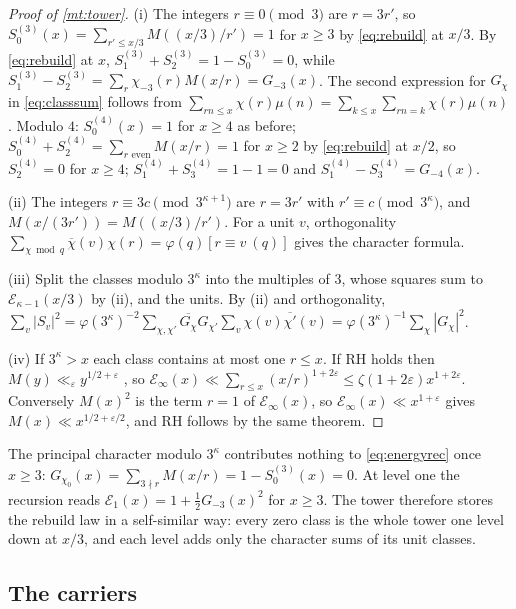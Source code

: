 \documentclass[11pt]{article}
\theoremstyle{definition}\newtheorem{definition}[theorem]{Definition}
\theoremstyle{remark}\newtheorem{remark}[theorem]{Remark}
\theoremstyle{definition}\newtheorem{axiom}{Axiom}
\begin{document}
\begin{proof}[Proof of \cref{mt:tower}]
(i) The integers $r\equiv0\pmod3$ are $r=3r'$, so $S^{(3)}_0(x)=\sum_{r'\le x/3}M((x/3)/r')=1$ for $x\ge3$ by \eqref{eq:rebuild} at $x/3$. By \eqref{eq:rebuild} at $x$, $S^{(3)}_1+S^{(3)}_2=1-S^{(3)}_0=0$, while $S^{(3)}_1-S^{(3)}_2=\sum_r\chi_{-3}(r)M(x/r)=G_{-3}(x)$. The second expression for $G_\chi$ in \eqref{eq:classsum} follows from $\sum_{rn\le x}\chi(r)\mu(n)=\sum_{k\le x}\sum_{rn=k}\chi(r)\mu(n)$. Modulo $4$: $S^{(4)}_0(x)=1$ for $x\ge4$ as before; $S^{(4)}_0+S^{(4)}_2=\sum_{r\text{ even}}M(x/r)=1$ for $x\ge2$ by \eqref{eq:rebuild} at $x/2$, so $S^{(4)}_2=0$ for $x\ge4$; $S^{(4)}_1+S^{(4)}_3=1-1=0$ and $S^{(4)}_1-S^{(4)}_3=G_{-4}(x)$.

(ii) The integers $r\equiv3c\pmod{3^{\kappa+1}}$ are $r=3r'$ with $r'\equiv c\pmod{3^\kappa}$, and $M(x/(3r'))=M((x/3)/r')$. For a unit $v$, orthogonality $\sum_{\chi\bmod q}\overline\chi(v)\chi(r)=\varphi(q)[r\equiv v\ (q)]$ gives the character formula.

(iii) Split the classes modulo $3^\kappa$ into the multiples of $3$, whose squares sum to $\mathcal E_{\kappa-1}(x/3)$ by (ii), and the units. By (ii) and orthogonality, $\sum_v|S_v|^2=\varphi(3^\kappa)^{-2}\sum_{\chi,\chi'}\overline{G_\chi}G_{\chi'}\sum_v\chi(v)\overline{\chi'}(v)=\varphi(3^\kappa)^{-1}\sum_\chi|G_\chi|^2$.

(iv) If $3^\kappa>x$ each class contains at most one $r\le x$. If RH holds then $M(y)\ll_\varepsilon y^{1/2+\varepsilon}$ \cite[Theorem 14.25(C)]{Titchmarsh}, so $\mathcal E_\infty(x)\ll\sum_{r\le x}(x/r)^{1+2\varepsilon}\le\zeta(1+2\varepsilon)x^{1+2\varepsilon}$. Conversely $M(x)^2$ is the term $r=1$ of $\mathcal E_\infty(x)$, so $\mathcal E_\infty(x)\ll x^{1+\varepsilon}$ gives $M(x)\ll x^{1/2+\varepsilon/2}$, and RH follows by the same theorem.
\end{proof}

The principal character modulo $3^\kappa$ contributes nothing to \eqref{eq:energyrec} once $x\ge3$: $G_{\chi_0}(x)=\sum_{3\nmid r}M(x/r)=1-S^{(3)}_0(x)=0$. At level one the recursion reads $\mathcal E_1(x)=1+\frac12G_{-3}(x)^2$ for $x\ge3$. The tower therefore stores the rebuild law in a self-similar way: every zero class is the whole tower one level down at $x/3$, and each level adds only the character sums of its unit classes.

\subsection{The carriers}
\end{document}
